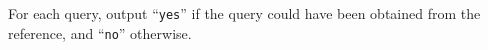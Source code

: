 
    For each query, output ``\texttt{yes}'' if the query could have been obtained from the reference, and ``\texttt{no}'' otherwise.
